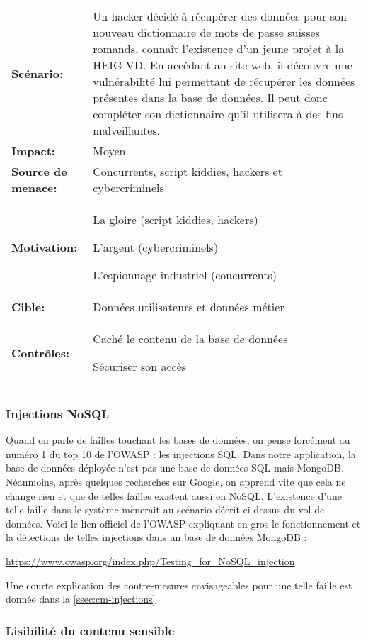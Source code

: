 \renewcommand{\arraystretch}{1.6}
\begin{tabular}{@{}p{4cm}p{12cm}}
\textbf{Scénario:} &  Un hacker décidé à récupérer des données pour son nouveau dictionnaire de mots de passe suisses romands, connaît l'existence d'un jeune projet à la HEIG-VD. En accédant au site web, il découvre une vulnérabilité lui permettant de récupérer les données présentes dans la base de données. Il peut donc compléter son dictionnaire qu'il utilisera à des fins malveillantes. \\
\textbf{Impact:} & Moyen \\
\textbf{Source de menace: } & Concurrents, script kiddies, hackers et cybercriminels \\
\textbf{Motivation:} & La gloire (script kiddies, hackers)

L'argent (cybercriminels)

L'espionnage industriel (concurrents) \\
\textbf{Cible:} & Données utilisateurs et données métier \\
\textbf{Contrôles:} & Caché le contenu de la base de données

Sécuriser son accès
\end{tabular}
\renewcommand{\arraystretch}{1}

\subsubsection{Injections NoSQL}

Quand on parle de failles touchant les bases de données, on pense forcément au numéro 1 du top 10 de l'OWASP : les injections SQL. Dans notre application, la base de données déployée n'est pas une base de données SQL mais MongoDB. Néanmoins, après quelques recherches sur Google, on apprend vite que cela ne change rien et que de telles failles existent aussi en NoSQL. L'existence d'une telle faille dans le système mènerait au scénario décrit ci-dessus du vol de données. Voici le lien officiel de l'OWASP expliquant en gros le fonctionnement et la détections de telles injections dans un base de données MongoDB :

\url{https://www.owasp.org/index.php/Testing_for_NoSQL_injection}

Une courte explication des contre-mesures envisageables pour une telle faille est donnée dans la \autoref{ssec:cm-injections}

\subsubsection{Lisibilité du contenu sensible}

